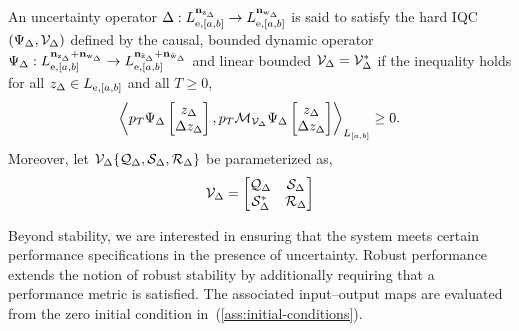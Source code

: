 \begin{definition}\label{def:uncertainty-iqc}

An uncertainty operator
$\Delta:
L_{{\mathrm{e}},[a,b]}^{\mathbf{n}_{{\mathrm{z}}_\Delta}}
\to
L_{{\mathrm{e}},[a,b]}^{\mathbf{n}_{{\mathrm{w}}_\Delta}}$
is said to satisfy the hard IQC $(\Psi_\Delta, {\mathcal{V}_\Delta})$ defined by the causal, bounded dynamic operator
$\Psi_\Delta:
L^{\mathbf{n}_{{\mathrm{z}}_\Delta} + \mathbf{n}_{{\mathrm{w}}_\Delta}}_{{\mathrm{e}}, [a,b]}
\to
L^{\mathbf{n}_{\tilde{{\mathrm{z}}}_{\Delta}} + \mathbf{n}_{\tilde{{\mathrm{w}}}_{\Delta}}}_{{\mathrm{e}}, [a,b]}$
and 
linear bounded $\mathcal{V}_\Delta = \mathcal{V}_\Delta^*$
if the inequality holds for all
$z_\Delta \in L_{{\mathrm{e}}, [a,b]}$ and all $T \geq 0$,
\begin{equation*}
\left\langle p_T \Psi_\Delta \begin{bmatrix}z_\Delta\\ \Delta z_\Delta\end{bmatrix}, p_T \mathcal{M}_{\mathcal{V}_\Delta}\Psi_\Delta\begin{bmatrix}z_\Delta\\ \Delta z_\Delta\end{bmatrix} \right\rangle
_{L_{[a,b]}}
\geq 0.
\end{equation*}
Moreover, let
$\mathcal{V}_\Delta\{\mathcal{Q}_\Delta, \mathcal{S}_\Delta, \mathcal{R}_\Delta\}$
be parameterized as,
\begin{equation*}
\mathcal{V}_\Delta =
\begin{bmatrix}
\mathcal{Q}_\Delta & \mathcal{S}_\Delta \\
\mathcal{S}_\Delta^* & \mathcal{R}_\Delta
\end{bmatrix}
\end{equation*}
\end{definition}
Beyond stability, we are interested in ensuring that the system meets certain
performance specifications in the presence of uncertainty.
Robust performance extends the notion of robust stability by additionally
requiring that a performance metric is satisfied. The associated
input--output maps are evaluated from the zero initial condition
in~(\ref{ass:initial-conditions}).
